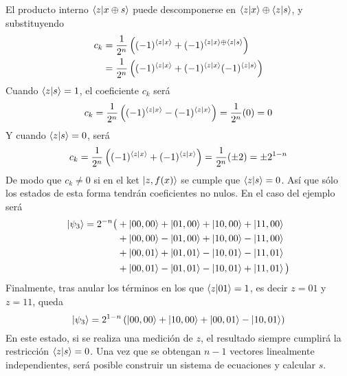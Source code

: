 %
El producto interno $\braket{z|x \oplus s}$ puede descomponerse en $\braket{z|x} 
\oplus \braket{z|s}$, y substituyendo
%
\begin{equation}
\begin{split}
c_k & = \frac{1}{2^n} \left((-1)^{\braket{z|x}} + (-1)^{\braket{z|x} \oplus 
\braket{z|s}} \right) \\
	& = \frac{1}{2^n} \left((-1)^{\braket{z|x}} + (-1)^{\braket{z|x}}
	(-1)^{\braket{z|s}} \right)
\end{split}
\end{equation}
%
Cuando $\braket{z|s} = 1$, el coeficiente $c_k$ será
%
\begin{equation}
\begin{split}
c_k = \frac{1}{2^n} \left((-1)^{\braket{z|x}} - (-1)^{\braket{z|x}} \right) =
	\frac{1}{2^n} (0) = 0
\end{split}
\end{equation}
%
Y cuando $\braket{z|s} = 0$, será
%
\begin{equation}
c_k = \frac{1}{2^n} \left((-1)^{\braket{z|x}} + (-1)^{\braket{z|x}} \right)
	= \frac{1}{2^n} (\pm 2) = \pm 2^{1-n}
\end{equation}
%
De modo que $c_k \neq 0$ si en el ket $\ket{z, f(x)}$ se cumple que 
$\braket{z|s} = 0$. Así que sólo los estados de esta forma tendrán coeficientes 
no nulos. En el caso del ejemplo será
%
\begin{equation}
\begin{split}
\ket{\psi_3} = 2^{-n} \big( &
		+ \ket{00,00} + \ket{01,00} + \ket{10,00} + \ket{11,00} \\
	& + \ket{00,00} - \ket{01,00} + \ket{10,00} - \ket{11,00} \\
	& + \ket{00,01} + \ket{01,01} - \ket{10,01} - \ket{11,01} \\
	& + \ket{00,01} - \ket{01,01} - \ket{10,01} + \ket{11,01}
	\big)
\end{split}
\end{equation}
%
Finalmente, tras anular los términos en los que $\braket{z|01} = 1$, es decir 
$z=01$ y $z=11$, queda
%
\begin{equation}
	\ket{\psi_3} = 2^{1-n} \left( \ket{00,00} + \ket{10,00} + \ket{00,01} - 
\ket{10,01} \right)
\end{equation}
%
En este estado, si se realiza una medición de $z$, el resultado siempre cumplirá 
la restricción $\braket{z|s} = 0$. Una vez que se obtengan $n-1$ vectores 
linealmente independientes, será posible construir un sistema de ecuaciones y 
calcular $s$.

